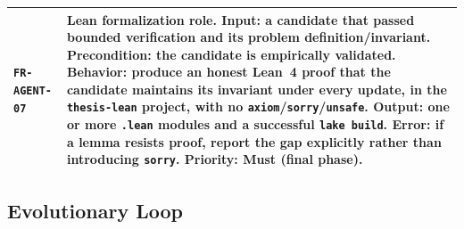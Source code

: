 \documentclass[12pt,a4paper]{article}
\begin{document}
\begin{longtable}{@{}p{2.2cm}p{10.6cm}@{}}
\texttt{FR-AGENT-07} & \textbf{Lean formalization role.} Input: a candidate that passed bounded verification and its problem definition/invariant. Precondition: the candidate is empirically validated. Behavior: produce an honest Lean~4 proof that the candidate maintains its invariant under every update, in the \texttt{thesis-lean} project, with no \texttt{axiom}/\texttt{sorry}/\texttt{unsafe}. Output: one or more \texttt{.lean} modules and a successful \texttt{lake build}. Error: if a lemma resists proof, report the gap explicitly rather than introducing \texttt{sorry}. Priority: Must (final phase). \\
\bottomrule
\end{longtable}

\subsection{Evolutionary Loop}
\label{sec:evo}
\end{document}
